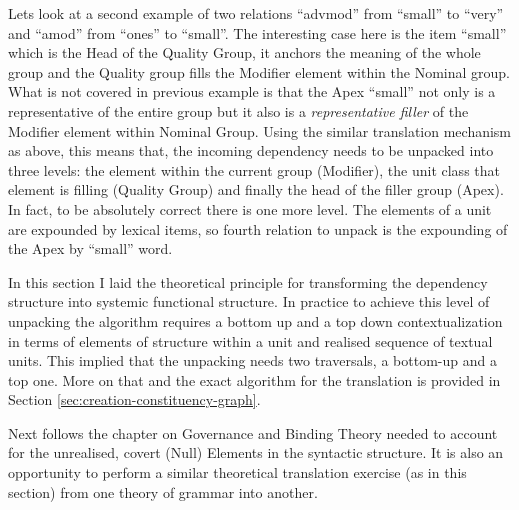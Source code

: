 Lets look at a second example of two relations ``advmod'' from ``small'' to ``very'' and ``amod'' from ``ones'' to ``small''. The interesting case here is the item ``small'' which is the Head of the Quality Group, it anchors the meaning of the whole group and the Quality group fills the Modifier element within the Nominal group. What is not covered in previous example is that the Apex ``small'' not only is a representative of the entire group but it also is a \textit{representative filler} of the Modifier element within Nominal Group. Using the similar translation mechanism as above, this means that, the incoming dependency needs to be unpacked into three levels: the element within the current group (Modifier), the unit class that element is filling (Quality Group) and finally the head of the filler group (Apex). In fact, to be absolutely correct there is one more level. The elements of a unit are expounded by lexical items, so fourth relation to unpack is the expounding of the Apex by ``small'' word.

In this section I laid the theoretical principle for transforming the dependency structure into systemic functional structure. In practice to achieve this level of unpacking the algorithm requires a bottom up and a top down contextualization in terms of elements of structure within a unit and realised sequence of textual units. This implied that the unpacking needs two traversals, a bottom-up and a top one. More on that and the exact algorithm for the translation is provided in Section \ref{sec:creation-constituency-graph}.

Next follows the chapter on Governance and Binding Theory needed to account for the unrealised, covert (Null) Elements in the syntactic structure. It is also an opportunity to perform a similar theoretical translation exercise (as in this section) from one theory of grammar into another.

%
%
%
